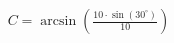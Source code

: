 \documentclass[preview]{standalone}
\begin{document}
\begin{align*}
C = \arcsin\left(\frac{10 \cdot \sin(30^\circ)}{10}\right)
\end{align*}
\end{document}
